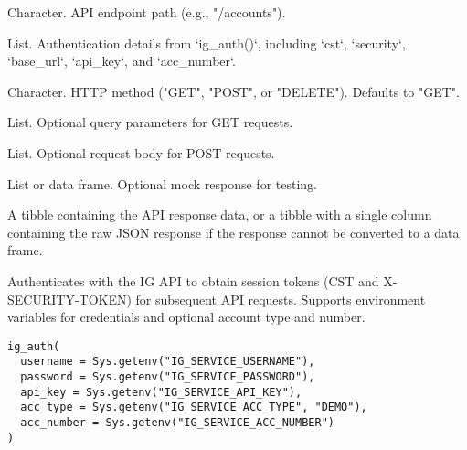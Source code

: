 \documentclass[a4paper]{book}
\begin{document}
\begin{Arguments}
\begin{ldescription}
\item[\code{path}] Character. API endpoint path (e.g., "/accounts").

\item[\code{auth}] List. Authentication details from `ig\_auth()`, including `cst`, `security`, `base\_url`, `api\_key`, and `acc\_number`.

\item[\code{method}] Character. HTTP method ("GET", "POST", or "DELETE"). Defaults to "GET".

\item[\code{query}] List. Optional query parameters for GET requests.

\item[\code{body}] List. Optional request body for POST requests.

\item[\code{mock\_response}] List or data frame. Optional mock response for testing.
\end{ldescription}
\end{Arguments}
%
\begin{Value}
A tibble containing the API response data, or a tibble with a single column
containing the raw JSON response if the response cannot be converted to a data frame.
\end{Value}
%
\begin{Description}
Authenticates with the IG API to obtain session tokens (CST and X-SECURITY-TOKEN)
for subsequent API requests. Supports environment variables for credentials and
optional account type and number.
\end{Description}
%
\begin{Usage}
\begin{verbatim}
ig_auth(
  username = Sys.getenv("IG_SERVICE_USERNAME"),
  password = Sys.getenv("IG_SERVICE_PASSWORD"),
  api_key = Sys.getenv("IG_SERVICE_API_KEY"),
  acc_type = Sys.getenv("IG_SERVICE_ACC_TYPE", "DEMO"),
  acc_number = Sys.getenv("IG_SERVICE_ACC_NUMBER")
)
\end{verbatim}
\end{Usage}
%
\end{document}
